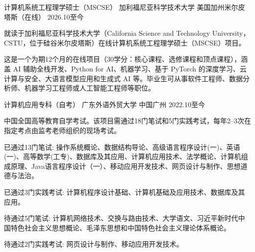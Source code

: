 

\begin{cventries}

  \cventry
    {计算机系统工程理学硕士（MSCSE）} %
    {加利福尼亚科学技术大学} %
    {美国加州米尔皮塔斯（在线）} %
    {2026.10至今} %
    {
      \begin{cvitems} %
        \item {就读于加利福尼亚科学技术大学（California Science and Technology University，CSTU，位于硅谷米尔皮塔斯）在线计算机系统工程理学硕士（MSCSE）项目。}
        \item {这是一个为期12个月的在线项目（30学分：核心课程、选修课程和顶点课程），涵盖 AI 辅助全栈开发、Python for AI、机器学习、基于 PyTorch 的深度学习、云计算与安全、大语言模型应用和生成式 AI 等。毕业生可从事软件工程师、数据分析师、机器学习工程师或人工智能工程师等职位。}
      \end{cvitems}
    }
  \cventry
    {计算机应用专科（自考）} %
    {广东外语外贸大学} %
    {中国广州} %
    {2022.10至今} %
    {
      \begin{cvitems} %
        \item {中国全国高等教育自学考试。该项目需通过18门笔试和5门实践考试，每年2--3次在指定考点由监考老师组织的现场考试。}
        \item {已通过13门笔试: 操作系统概论、数据结构导论、高级语言程序设计(一)、英语(一)、高等数学(工专)、数据库及其应用、计算机应用技术、法学概论、计算机组成原理、Java语言程序设计（一）、移动应用开发技术、网页设计与制作、思想道德与法治。}
        \item {已通过3门实践考试: 计算机程序设计基础、计算机基础及应用技术、数据库及其应用。}
        \item {待通过5门笔试: 计算机网络技术、交换与路由技术、大学语文、习近平新时代中国特色社会主义思想概论、毛泽东思想和中国特色社会主义理论体系概论。}
        \item {待通过2门实践考试: 网页设计与制作、移动应用开发技术。}

\end{cvitems}}
\end{cventries}
